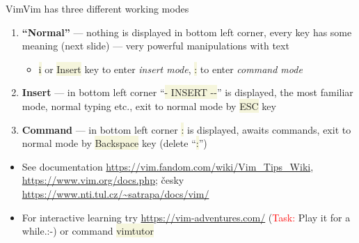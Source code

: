 \documentclass[compress, xelatex, 11pt, xcolor=svgnames, aspectratio=169, url={hyphens, lowtilde}]{beamer}
\renewcommand{\texttt}[1]{\colorbox{Beige}{{\ttfamily #1}}}
\renewcommand{\alert}[1]{\textcolor{red}{#1}}
\begin{document}
\begin{frame}{Vim}{Vim has three different working modes}
	\label{vim}
	\begin{enumerate}
		\item \textbf{\enquote{Normal}} --- nothing is displayed in bottom left corner, every key has some meaning (next slide) --- very powerful manipulations with text
		\begin{itemize}
			\item \texttt{i} or \texttt{Insert} key to enter \textit{insert mode}, \texttt{:} to enter \textit{command mode}
		\end{itemize}
		\item \textbf{Insert} --- in bottom left corner \enquote{\texttt{{-}- INSERT -{-}}} is displayed, the most familiar mode, normal typing etc., exit to normal mode by \texttt{ESC} key
		\item \textbf{Command} --- in bottom left corner \texttt{:} is displayed, awaits commands, exit to normal mode by \texttt{Backspace} key (delete \enquote{\texttt{:}})
	\end{enumerate}
	\begin{itemize}
		\item See documentation \url{https://vim.fandom.com/wiki/Vim_Tips_Wiki}, \url{https://www.vim.org/docs.php}; česky \url{https://www.nti.tul.cz/~satrapa/docs/vim/}
		\item For interactive learning try \url{https://vim-adventures.com/} (\alert{Task:} Play it for a while.:-) or command \texttt{vimtutor}
	\end{itemize}
\end{frame}
\end{document}
